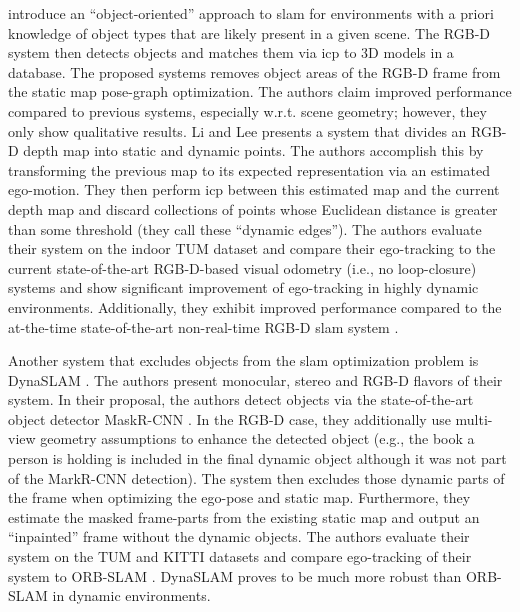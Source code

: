 \documentclass[headsepline, hidelinks, footsepline, footinclude=false, oneside, fontsize=11pt, paper=a4, listof=totoc, bibliography=totoc]{scrbook}
\begin{document}
\cite{salas-morenoSLAMSimultaneousLocalisation2013} introduce an ``object-oriented'' approach to \gls{slam} for environments with a priori knowledge of object types that are likely present in a given scene. The RGB-D system then detects
objects and matches them via \gls{icp} to 3D models in a database. The proposed systems removes object areas of the RGB-D frame from the static map pose-graph optimization. 
The authors claim improved performance compared to previous systems, especially w.r.t. scene geometry; however, they only show qualitative results.
Li and Lee \cite{liRGBDSLAMDynamic2017} presents a system that divides an RGB-D depth map into static and dynamic points. The authors accomplish this by transforming the previous map to its expected
representation via an estimated ego-motion. They then perform \gls{icp} between this estimated map and the current depth map and discard collections of points whose Euclidean distance is greater than some threshold (they call these ``dynamic edges'').
The authors evaluate their system on the indoor TUM dataset \cite{sturmBenchmarkEvaluationRGBD2012} and compare their ego-tracking to the current state-of-the-art RGB-D-based visual odometry (i.e., no loop-closure)
 systems \cite{kerlRobustOdometryEstimation2013,kimEffectiveBackgroundModelBased2016} and show significant improvement of ego-tracking in highly dynamic environments. 
Additionally, they exhibit improved performance compared to the at-the-time state-of-the-art non-real-time RGB-D \gls{slam} system \cite{sunImprovingRGBDSLAM2017}.

Another system that excludes objects from the \gls{slam} optimization problem is DynaSLAM \cite{bescosDynaSLAMTrackingMapping2018}. 
The authors present monocular, stereo and RGB-D flavors of their system. In their proposal, the authors detect objects via the state-of-the-art object detector MaskR-CNN \cite{heMaskRCNN2018}.
In the RGB-D case, they additionally use multi-view geometry assumptions to enhance the detected object (e.g., the book a person is holding is included in the final dynamic object although it was not part of the MarkR-CNN detection).
The system then excludes those dynamic parts of the frame when optimizing the ego-pose and static map. 
Furthermore, they estimate the masked frame-parts from the existing static map and output an ``inpainted'' frame without the dynamic objects.
The authors evaluate their system on the TUM \cite{sturmBenchmarkEvaluationRGBD2012} and KITTI \cite{geigerVisionMeetsRobotics2013} datasets and compare ego-tracking of their system to ORB-SLAM \cite{mur-artalORBSLAMVersatileAccurate2015a}.
DynaSLAM proves to be much more robust than ORB-SLAM in dynamic environments.
\end{document}
